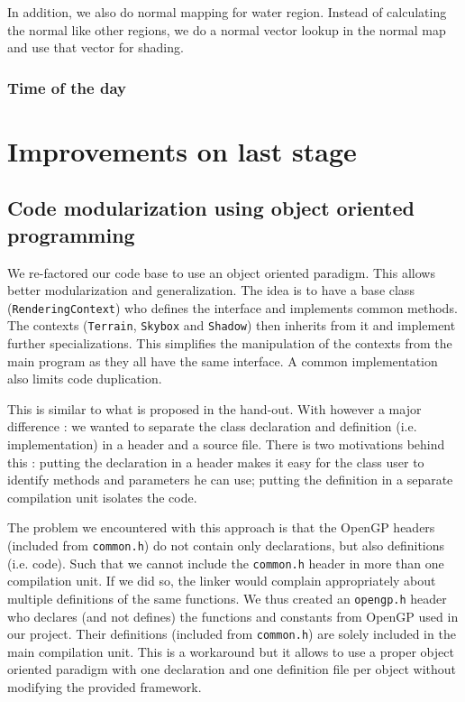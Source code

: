 \documentclass[a4paper,11pt]{article}
\begin{document}
In addition, we also do normal mapping for water region. Instead of calculating the normal like other regions, we do a normal vector lookup in the normal map and use that vector for shading. 

\subsubsection{Time of the day}


\section{Improvements on last stage}

\subsection{Code modularization using object oriented programming}

We re-factored our code base to use an object oriented paradigm. This allows better modularization and generalization. The idea is to have a base class (\texttt{RenderingContext}) who defines the interface and implements common methods. The contexts (\texttt{Terrain}, \texttt{Skybox} and \texttt{Shadow}) then inherits from it and implement further specializations. This simplifies the manipulation of the contexts from the main program as they all have the same interface. A common implementation also limits code duplication.

This is similar to what is proposed in the hand-out. With however a major difference : we wanted to separate the class declaration and definition (i.e. implementation) in a header and a source file. There is two motivations behind this : putting the declaration in a header makes it easy for the class user to identify methods and parameters he can use; putting the definition in a separate compilation unit isolates the code.

The problem we encountered with this approach is that the OpenGP headers (included from \texttt{common.h}) do not contain only declarations, but also definitions (i.e. code). Such that we cannot include the \texttt{common.h} header in more than one compilation unit. If we did so, the linker would complain appropriately about multiple definitions of the same functions. We thus created an \texttt{opengp.h} header who declares (and not defines) the functions and constants from OpenGP used in our project. Their definitions (included from \texttt{common.h}) are solely included in the main compilation unit. This is a workaround but it allows to use a proper object oriented paradigm with one declaration and one definition file per object without modifying the provided framework.
\end{document}
